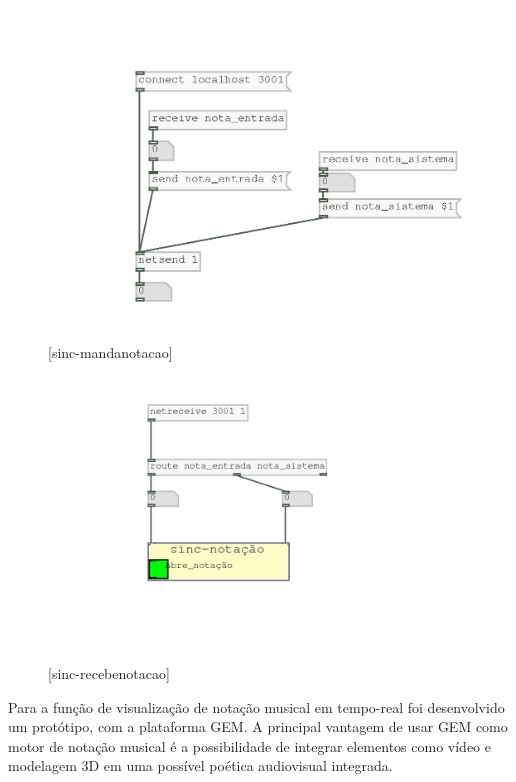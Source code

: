 \documentclass{ppgmus}
\begin{document}
\begin{figure}
\includegraphics[scale=.6]{sinc-mandanotacao}
\caption{[sinc-mandanotacao]}
\label{sinc-mandanotacao}
\end{figure} 

\begin{figure}
\includegraphics[scale=.6]{sinc-recebenotacao}
\caption{[sinc-recebenotacao]}
\label{sinc-recebenotacao}
\end{figure} 

Para a função de visualização de notação musical
em tempo-real foi desenvolvido um protótipo, com a plataforma GEM.
A principal vantagem de usar GEM como motor de notação musical é a possibilidade
de integrar elementos como vídeo e modelagem 3D em uma possível poética audiovisual integrada.
\end{document}
